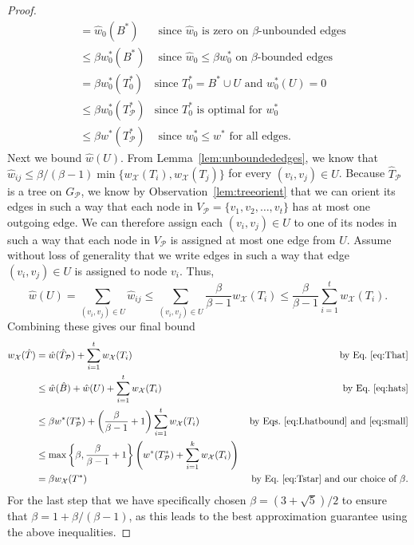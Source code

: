 \begin{proof}
\begin{align*}
		& = \hat{w}_0(B^*) & \text{ since $\hat{w}_0$ is zero on $\beta$-unbounded edges} \\
		& \leq \beta w^*_0(B^*) & \text{ since $\hat{w}_0 \leq \beta w^*_0$ on $\beta$-bounded edges}\\
		&= \beta w^*_0(T_0^*) & \text{since $T_0^* = B^* \cup U$ and $w^*_0(U) = 0$}  \\
		&\leq \beta w^*_0(T_\mathcal{P}^*) & \text{since $T_0^*$ is optimal for $w_0^*$}  \\
		& \leq \beta w^*(T_\mathcal{P}^*) & \text{ since $w^*_0 \leq w^*$ for all edges.}
	\end{align*}	
	Next we bound $\hat{w}(U)$. From Lemma~\ref{lem:unboundededges}, we know that $\hat{w}_{ij} \leq {\beta}/({\beta-1}) \min \{w_\mathcal{X}(T_i), w_\mathcal{X}(T_j)\}$ for every $(v_i, v_j) \in U$. Because $\hat{T}_\mathcal{P}$ is a tree on $G_\mathcal{P}$, we know by Observation~\ref{lem:treeorient} that we can orient its edges in such a way that each node in $V_\mathcal{P} = \{v_1, v_2, \hdots, v_t\}$ has at most one outgoing edge. 
	We can therefore assign each $(v_i, v_j) \in U$ to one of its nodes in such a way that each node in $V_\mathcal{P}$ is assigned at most one edge from $U$. Assume without loss of generality that we write edges in such a way that edge $(v_i, v_j) \in U$ is assigned to node $v_i$. Thus,
	\begin{equation}
		\label{eq:small}
		\hat{w}(U) = \sum_{(v_i, v_j) \in U} \hat{w}_{ij} \leq \sum_{(v_i, v_j) \in U} \frac{\beta}{\beta-1} w_\mathcal{X}(T_i) \leq \frac{\beta}{\beta-1} \sum_{i = 1}^t w_\mathcal{X}(T_i).
	\end{equation}
	Combining these gives our final bound
	\begin{align*}
		w_\mathcal{X}(\hat{T}) 
		&= \hat{w}(\hat{T}_\mathcal{P}) + \sum_{i = 1}^t w_\mathcal{X}(T_i)  & \text{by Eq.~\eqref{eq:That}}\\
		&\leq \hat{w}(\hat{B}) + \hat{w}(U) +  \sum_{i = 1}^t w_\mathcal{X}(T_i)  & \text{by Eq.~\eqref{eq:hats}}\\
		& \leq \beta w^*(T^*_\mathcal{P}) + \left(\frac{\beta}{\beta-1} + 1\right) \sum_{i = 1}^t w_\mathcal{X}(T_i) & \text{by Eqs.~\eqref{eq:Lhatbound} and~\eqref{eq:small}}\\
		&\leq \max \left\{ \beta, \frac{\beta}{\beta - 1} + 1 \right\} \left(w^*(T_\mathcal{P}^*) +  \sum_{i = 1}^k w_\mathcal{X}(T_i) \right)  \\
		&= \beta w_\mathcal{X}(T^*) &\text{ by Eq.~\eqref{eq:Tstar} and our choice of $\beta$.}
	\end{align*}
	For the last step that we have specifically chosen $\beta = (3+\sqrt{5})/2$ to ensure that $\beta = 1 + \beta/(\beta-1)$, as this leads to the best approximation guarantee using the above inequalities. 
\end{proof}

